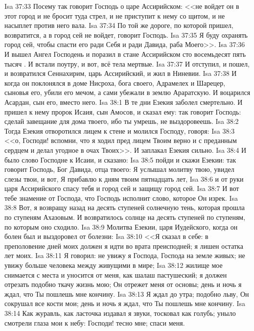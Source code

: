 \vs Isa 37:33 Посему так говорит Господь о царе Ассирийском: <<не войдет он в этот город и не бросит туда стрел, и не приступит к нему со щитом, и не насыплет против него вала.
\vs Isa 37:34 По той же дороге, по которой пришел, возвратится, а в город сей не войдет, говорит Господь.
\vs Isa 37:35 Я буду охранять город сей, чтобы спасти его ради Себя и ради Давида, раба Моего>>.
\vs Isa 37:36 И вышел Ангел Господень и поразил в стане Ассирийском сто восемьдесят пять тысяч . И встали поутру, и вот, всё тела мертвые.
\vs Isa 37:37 И отступил, и пошел, и возвратился Сеннахирим, царь Ассирийский, и жил в Ниневии.
\vs Isa 37:38 И когда он поклонялся в доме Нисроха, бога своего, Адрамелех и Шарецер, сыновья его, убили его мечом, а сами убежали в землю Араратскую. И воцарился Асардан, сын его, вместо него.
\vs Isa 38:1 В те дни Езекия заболел смертельно. И пришел к нему пророк Исаия, сын Амосов, и сказал ему: так говорит Господь: сделай завещание для дома твоего, ибо ты умрешь, не выздоровеешь.
\vs Isa 38:2 Тогда Езекия отворотился лицем к стене и молился Господу, говоря:
\vs Isa 38:3 <<о, Господи! вспомни, что я ходил пред лицем Твоим верно и с преданным  сердцем и делал угодное в очах Твоих>>. И заплакал Езекия сильно.
\rsbpar\vs Isa 38:4 И было слово Господне к Исаии, и сказано:
\vs Isa 38:5 пойди и скажи Езекии: так говорит Господь, Бог Давида, отца твоего: Я услышал молитву твою, увидел слезы твои, и вот, Я прибавлю к дням твоим пятнадцать лет,
\vs Isa 38:6 и от руки царя Ассирийского спасу тебя и город сей и защищу город сей.
\vs Isa 38:7 И вот тебе знамение от Господа, что Господь исполнит слово, которое Он изрек.
\vs Isa 38:8 Вот, я возвращу назад на десять ступеней солнечную тень, которая прошла по ступеням Ахазовым. И возвратилось солнце на десять ступеней по ступеням, по которым оно сходило.
\rsbpar\vs Isa 38:9 Молитва Езекии, царя Иудейского, когда он болен был и выздоровел от болезни:
\vs Isa 38:10 <<Я сказал в себе: в преполовение дней моих должен я идти во врата преисподней; я лишен остатка лет моих.
\vs Isa 38:11 Я говорил: не увижу я Господа, Господа на земле живых; не увижу больше человека между живущими в мире;
\vs Isa 38:12 жилище мое снимается с места и уносится от меня, как шалаш пастушеский; я должен отрезать подобно ткачу жизнь мою; Он отрежет меня от основы; день и ночь я ждал, что Ты пошлешь мне кончину.
\vs Isa 38:13 Я ждал до утра; подобно льву, Он сокрушал все кости мои; день и ночь я ждал, что Ты пошлешь мне кончину.
\vs Isa 38:14 Как журавль, как ласточка издавал я звуки, тосковал как голубь; уныло смотрели глаза мои к небу: Господи! тесно мне; спаси меня.
